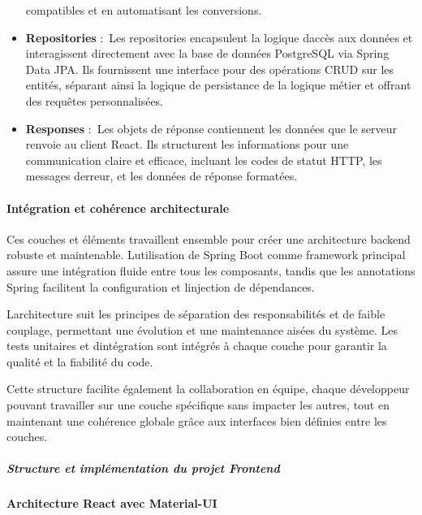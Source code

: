 \documentclass[12pt,a4paper,twoside]{report}
\begin{document}
\begin{itemize}
  compatibles et en automatisant les conversions.
\item
  \textbf{Repositories} :~Les repositories encapsulent la logique
  d\textquotesingle accès aux données et interagissent directement avec
  la base de données PostgreSQL via Spring Data JPA. Ils fournissent une
  interface pour des opérations CRUD sur les entités, séparant ainsi la
  logique de persistance de la logique métier et offrant des requêtes
  personnalisées.
\item
  \textbf{Responses} :~Les objets de réponse contiennent les données que
  le serveur renvoie au client React. Ils structurent les informations
  pour une communication claire et efficace, incluant les codes de
  statut HTTP, les messages d\textquotesingle erreur, et les données de
  réponse formatées.
\end{itemize}

\hypertarget{intuxe9gration-et-cohuxe9rence-architecturale}{%
\paragraph{Intégration et cohérence
architecturale}\label{intuxe9gration-et-cohuxe9rence-architecturale}}

Ces couches et éléments travaillent ensemble pour créer une architecture
backend robuste et maintenable. L\textquotesingle utilisation de Spring
Boot comme framework principal assure une intégration fluide entre tous
les composants, tandis que les annotations Spring facilitent la
configuration et l\textquotesingle injection de dépendances.

L\textquotesingle architecture suit les principes de séparation des
responsabilités et de faible couplage, permettant une évolution et une
maintenance aisées du système. Les tests unitaires et
d\textquotesingle intégration sont intégrés à chaque couche pour
garantir la qualité et la fiabilité du code.

Cette structure facilite également la collaboration en équipe, chaque
développeur pouvant travailler sur une couche spécifique sans impacter
les autres, tout en maintenant une cohérence globale grâce aux
interfaces bien définies entre les couches.

\hypertarget{structure-et-impluxe9mentation-du-projet-frontend}{%
\subparagraph{Structure et implémentation du projet
Frontend}\label{structure-et-impluxe9mentation-du-projet-frontend}}

\hypertarget{architecture-react-avec-material-ui}{%
\paragraph{Architecture React avec
Material-UI}\label{architecture-react-avec-material-ui}}
\end{document}
